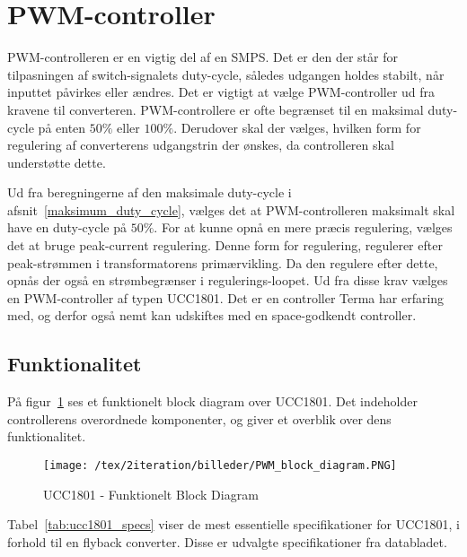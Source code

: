 
\section{PWM-controller} \label{PWM}
PWM-controlleren er en vigtig del af en SMPS. Det er den der står for tilpasningen af switch-signalets duty-cycle, således udgangen holdes stabilt, når inputtet påvirkes eller ændres. Det er vigtigt at vælge PWM-controller ud fra kravene til converteren. PWM-controllere er ofte begrænset til en maksimal duty-cycle på enten $50\percent$ eller $100\percent$. Derudover skal der vælges, hvilken form for regulering af converterens udgangstrin der ønskes, da controlleren skal understøtte dette. 

Ud fra beregningerne af den maksimale duty-cycle i afsnit~\ref{maksimum_duty_cycle}, vælges det at PWM-controlleren maksimalt skal have en duty-cycle på $50\percent$. For at kunne opnå en mere præcis regulering, vælges det at bruge peak-current regulering. Denne form for regulering, regulerer efter peak-strømmen i transformatorens primærvikling. Da den regulere efter dette, opnås der også en strømbegrænser i regulerings-loopet. Ud fra disse krav vælges en PWM-controller af typen UCC1801\cite{UCC1801}. Det er en controller Terma har erfaring med, og derfor også nemt kan udskiftes med en space-godkendt controller.

\subsection{Funktionalitet}
På figur~\ref{fig:PWM_block_diagram} ses et funktionelt block diagram over UCC1801. Det indeholder controllerens overordnede komponenter, og giver et overblik over dens funktionalitet. 

\begin{figure}[H]
	\center
	\texttt{[image: /tex/2iteration/billeder/PWM\_block\_diagram.PNG]}
	\caption{UCC1801 - Funktionelt Block Diagram}
	\label{fig:PWM_block_diagram}
\end{figure}

Tabel~\ref{tab:ucc1801_specs} viser de mest essentielle specifikationer for UCC1801, i forhold til en flyback converter. Disse er udvalgte specifikationer fra databladet.

